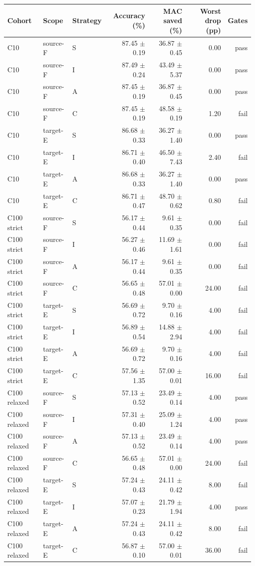 \begin{tabular}{lllrrrr}
\hline
Cohort & Scope & Strategy & Accuracy (\%) & MAC saved (\%) & Worst drop (pp) & Gates \\
\hline
C10 & source-F & S & 87.45 $\pm$ 0.19 & 36.87 $\pm$ 0.45 & 0.00 & pass \\
C10 & source-F & I & 87.49 $\pm$ 0.24 & 43.49 $\pm$ 5.37 & 0.00 & pass \\
C10 & source-F & A & 87.45 $\pm$ 0.19 & 36.87 $\pm$ 0.45 & 0.00 & pass \\
C10 & source-F & C & 87.45 $\pm$ 0.19 & 48.58 $\pm$ 0.19 & 1.20 & fail \\
C10 & target-E & S & 86.68 $\pm$ 0.33 & 36.27 $\pm$ 1.40 & 0.00 & pass \\
C10 & target-E & I & 86.71 $\pm$ 0.40 & 46.50 $\pm$ 7.43 & 2.40 & fail \\
C10 & target-E & A & 86.68 $\pm$ 0.33 & 36.27 $\pm$ 1.40 & 0.00 & pass \\
C10 & target-E & C & 86.71 $\pm$ 0.47 & 48.70 $\pm$ 0.62 & 0.80 & fail \\
C100 strict & source-F & S & 56.17 $\pm$ 0.44 & 9.61 $\pm$ 0.35 & 0.00 & fail \\
C100 strict & source-F & I & 56.27 $\pm$ 0.46 & 11.69 $\pm$ 1.61 & 0.00 & fail \\
C100 strict & source-F & A & 56.17 $\pm$ 0.44 & 9.61 $\pm$ 0.35 & 0.00 & fail \\
C100 strict & source-F & C & 56.65 $\pm$ 0.48 & 57.01 $\pm$ 0.00 & 24.00 & fail \\
C100 strict & target-E & S & 56.69 $\pm$ 0.72 & 9.70 $\pm$ 0.16 & 4.00 & fail \\
C100 strict & target-E & I & 56.89 $\pm$ 0.54 & 14.88 $\pm$ 2.94 & 4.00 & fail \\
C100 strict & target-E & A & 56.69 $\pm$ 0.72 & 9.70 $\pm$ 0.16 & 4.00 & fail \\
C100 strict & target-E & C & 57.56 $\pm$ 1.35 & 57.00 $\pm$ 0.01 & 16.00 & fail \\
C100 relaxed & source-F & S & 57.13 $\pm$ 0.52 & 23.49 $\pm$ 0.14 & 4.00 & pass \\
C100 relaxed & source-F & I & 57.31 $\pm$ 0.40 & 25.09 $\pm$ 1.24 & 4.00 & pass \\
C100 relaxed & source-F & A & 57.13 $\pm$ 0.52 & 23.49 $\pm$ 0.14 & 4.00 & pass \\
C100 relaxed & source-F & C & 56.65 $\pm$ 0.48 & 57.01 $\pm$ 0.00 & 24.00 & fail \\
C100 relaxed & target-E & S & 57.24 $\pm$ 0.43 & 24.11 $\pm$ 0.42 & 8.00 & fail \\
C100 relaxed & target-E & I & 57.07 $\pm$ 0.23 & 21.79 $\pm$ 1.94 & 4.00 & pass \\
C100 relaxed & target-E & A & 57.24 $\pm$ 0.43 & 24.11 $\pm$ 0.42 & 8.00 & fail \\
C100 relaxed & target-E & C & 56.87 $\pm$ 0.10 & 57.00 $\pm$ 0.01 & 36.00 & fail \\
\hline
\end{tabular}
